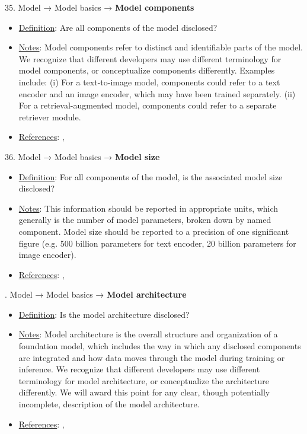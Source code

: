 35. Model → Model basics → \textbf{Model components}
\vspace{-\parskip}
\begin{itemize}
\item
\underline{Definition}: Are all components of the model disclosed?
\item
\underline{Notes}: Model components refer to distinct and identifiable parts of the model. We recognize that different developers may use different terminology for model components, or conceptualize components differently. Examples include: (i) For a text-to-image model, components could refer to a text encoder and an image encoder, which may have been trained separately. (ii) For a retrieval-augmented model, components could refer to a separate retriever module.
\item
\underline{References}: \citet{mitchell2019model}, \citet{crisan2022interactive}
\end{itemize}


36. Model → Model basics → \textbf{Model size}
\vspace{-\parskip}
\begin{itemize}
\item
\underline{Definition}: For all components of the model, is the associated model size disclosed?
\item
\underline{Notes}: This information should be reported in appropriate units, which generally is the number of model parameters, broken down by named component. Model size should be reported to a precision of one significant figure (e.g. 500 billion parameters for text encoder, 20 billion parameters for image encoder).
\item
\underline{References}: \citet{mitchell2019model}, \citet{crisan2022interactive}
\end{itemize}


. Model → Model basics → \textbf{Model architecture}
\vspace{-\parskip}
\begin{itemize}
\item
\underline{Definition}: Is the model architecture disclosed?
\item
\underline{Notes}: Model architecture is the overall structure and organization of a foundation model, which includes the way in which any disclosed components are integrated and how data moves through the model during training or inference. We recognize that different developers may use different terminology for model architecture, or conceptualize the architecture differently. We will award this point for any clear, though potentially incomplete, description of the model architecture.
\item
\underline{References}: \citet{mitchell2019model}, \citet{crisan2022interactive}
\end{itemize}


